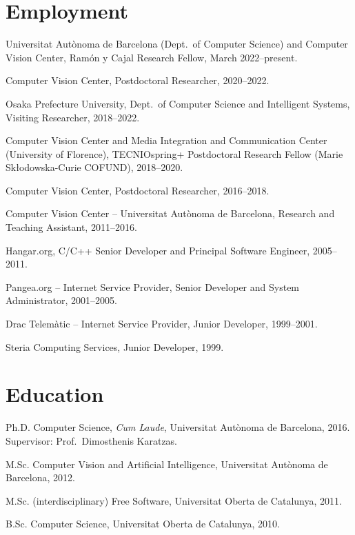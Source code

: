 \documentclass[11pt]{article}
\newenvironment{entries}{%
  \begin{list}{}{\setlength{\leftmargin}{3em}\setlength{\itemindent}{-1.5em}%
    \setlength{\itemsep}{0.35em}\setlength{\parsep}{0pt}\setlength{\topsep}{0.2em}}}%
  {\end{list}}
\begin{document}
\section*{Employment}
\begin{entries}
\item Universitat Autònoma de Barcelona (Dept.\ of Computer Science) and Computer Vision Center, Ramón y Cajal Research Fellow, March 2022--present.
\item Computer Vision Center, Postdoctoral Researcher, 2020--2022.
\item Osaka Prefecture University, Dept.\ of Computer Science and Intelligent Systems, Visiting Researcher, 2018--2022.
\item Computer Vision Center and Media Integration and Communication Center (University of Florence), TECNIOspring+ Postdoctoral Research Fellow (Marie Skłodowska-Curie COFUND), 2018--2020.
\item Computer Vision Center, Postdoctoral Researcher, 2016--2018.
\item Computer Vision Center -- Universitat Autònoma de Barcelona, Research and Teaching Assistant, 2011--2016.
\item Hangar.org, C/C++ Senior Developer and Principal Software Engineer, 2005--2011.
\item Pangea.org -- Internet Service Provider, Senior Developer and System Administrator, 2001--2005.
\item Drac Telemàtic -- Internet Service Provider, Junior Developer, 1999--2001.
\item Steria Computing Services, Junior Developer, 1999.
\end{entries}

\section*{Education}
\begin{entries}
\item Ph.D. Computer Science, \textit{Cum Laude}, Universitat Autònoma de Barcelona, 2016. Supervisor: Prof.\ Dimosthenis Karatzas.
\item M.Sc. Computer Vision and Artificial Intelligence, Universitat Autònoma de Barcelona, 2012.
\item M.Sc. (interdisciplinary) Free Software, Universitat Oberta de Catalunya, 2011.
\item B.Sc. Computer Science, Universitat Oberta de Catalunya, 2010.
\end{entries}
\end{document}
